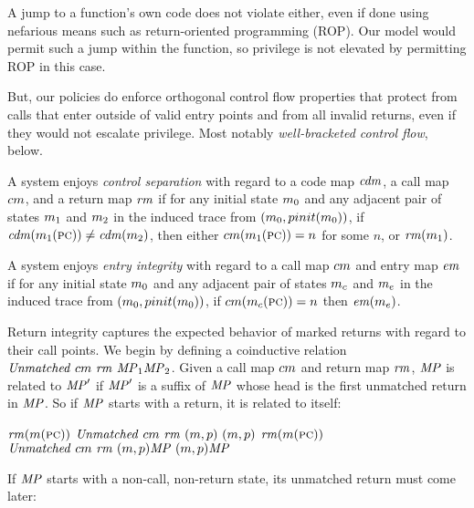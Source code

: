 \documentclass[acmsmall,review,anonymous]{acmart}\settopmatter{printfolios=true,printccs=false,printacmref=false}
\begin{document}
    A jump to a function's own code does not violate either, even if done using
    nefarious means such as return-oriented programming (ROP). Our model would
    permit such a jump within the function, so privilege is not elevated by
    permitting ROP in this case.

    But, our policies do enforce orthogonal control flow properties that
    protect from calls that enter outside of valid entry points and from all
    invalid returns, even if they would not escalate privilege. Most notably
    {\em well-bracketed control flow}, below.

A system enjoys {\em control separation} with regard to a code map
\(\mathit{cdm}\), a call map \(cm\), and a return map \(\mathit{rm}\) if
for any initial state \(m_0\) and any adjacent pair of states
\(m_1\) and \(m_2\) in the induced trace from
\((m_0,pinit(m_0))\), if
\(\mathit{cdm}(m_1(\textsc{pc})) \not = \mathit{cdm}(m_2)\), then either
\(cm(m_1(\textsc{pc})) = n\) for some \(n\), or
\(\mathit{rm}(m_1)\).

A system enjoys {\em entry integrity} with regard to a call map
\(cm\) and entry map \(\mathit{em}\) if for any initial state
\(m_0\) and any adjacent pair of states \(m_c\) and
\(m_e\) in the induced trace from
\((m_0,pinit(m_0))\), if
\(cm(m_c(\textsc{pc})) = n\) then \(\mathit{em}(m_e)\).

Return integrity captures the expected behavior of marked returns with
regard to their call points. We begin by defining a coinductive
relation \(\mathit{Unmatched}\ \callmap\ \retmap\ \MPT_1
\MPT_2\). Given a call map \(cm\) and return map \(\mathit{rm}\),
\(\mathit{MP}\) is related to \(\mathit{MP}'\) if \(\mathit{MP}'\) is a suffix of \(\mathit{MP}\)
whose head is the first unmatched return in \(\mathit{MP}\). So if \(\mathit{MP}\)
starts with a return, it is related to itself:

  \judgmenttwo{\(\callmap(\mach(\PCname)) = \bot\)}
           {\(\mathit{rm}(m(\textsc{pc}))\)}
      {\(\mathit{Unmatched}\ \callmap\ \retmap\ \mpstate{\mach}{\pol}\
        \mpstate{\mach}{\pol}\)}
  \judgmenttwo{\(\callmap(\mach(\PCname)) = \bot\)}
              {\(\mathit{rm}(m(\textsc{pc}))\)}
      {\(\mathit{Unmatched}\ \callmap\ \retmap\ \mpstate{\mach}{\pol}\MPT\
              \mpstate{\mach}{\pol}\MPT\)}

If \(\mathit{MP}\) starts with a non-call, non-return state, its unmatched
return must come later:
\end{document}
